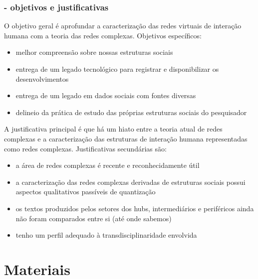 \documentclass[10pt]{beamer}
\begin{document}
\begin{frame}
\frametitle{- objetivos e justificativas}
O objetivo geral é aprofundar a caracterização das redes virtuais de interação humana
com a teoria das redes complexas.
Objetivos específicos:
\begin{itemize}
	\item melhor compreensão sobre nossas estruturas sociais
	\item entrega de um legado tecnológico para registrar e disponibilizar os desenvolvimentos
	\item entrega de um legado em dados sociais com fontes diversas
	\item delineio da prática de estudo das próprias estruturas sociais do pesquisador
\end{itemize}

\vspace{.5cm}

A justificativa principal é que há um hiato entre a teoria atual de redes complexas
e a caracterização das estruturas de interação humana representadas como redes complexas.
Justificativas secundárias são:
\begin{itemize}
	\item a área de redes complexas é recente e reconhecidamente útil
	\item a caracterização das redes complexas derivadas de estruturas sociais possui aspectos qualitativos passíveis de quantização
	\item os textos produzidos pelos setores dos hubs, intermediários e periféricos ainda não foram comparados entre si (até onde sabemos)
	\item tenho um perfil adequado à transdisciplinaridade envolvida
\end{itemize}

\end{frame}



\section{Materiais}
\end{document}
